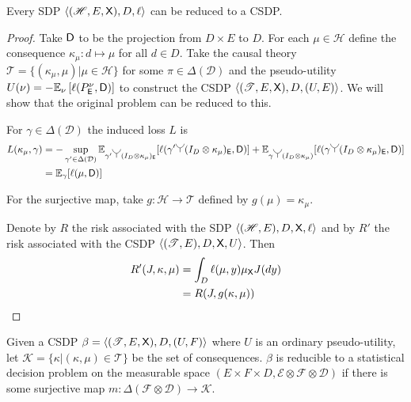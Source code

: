 \begin{theorem}
Every SDP $\langle (\mathscr{H},E,\mathsf{X}),D,\ell\rangle$ can be reduced to a CSDP.
\end{theorem}
\begin{proof}
Take $\mathsf{D}$ to be the projection from $D\times E$ to $D$. For each $\mu\in \mathscr{H}$ define the consequence $\kappa_\mu:d\mapsto \mu$ for all $d\in D$. Take the causal theory $\mathscr{T}=\{(\kappa_\mu,\mu)|\mu\in \mathscr{H}\}$ for some $\pi\in \Delta(\mathcal{D})$ and the pseudo-utility $U(\nu) = -\mathbb{E}_\nu \left[\ell(P^\nu_{\mathsf{E}},\mathsf{D})\right]$ to construct the CSDP $\langle (\mathscr{T},E,\mathsf{X}),D,(U,E)\rangle$. We will show that the original problem can be reduced to this.

For $\gamma\in \Delta(\mathcal{D})$ the induced loss $L$ is
\begin{align}
    L(\kappa_\mu,\gamma) &= -\sup_{\gamma'\in \Delta(\mathcal{D})} \mathbb{E}_{\gamma' \splitter{0.15}(I_D\otimes \kappa_\mu)_{\RV{E}}}[\ell(\gamma'\splitter{0.15}(I_D\otimes \kappa_\mu)_{\RV{E}},\RV{D})] + \mathbb{E}_{\gamma \splitter{0.15}(I_D\otimes \kappa_\mu)}[\ell(\gamma \splitter{0.15}(I_D\otimes \kappa_\mu)_{\RV{E}},\RV{D})]\\
                     &= \mathbb{E}_{\gamma}[\ell(\mu,\RV{D})]
\end{align}

For the surjective map, take $g:\mathscr{H}\to \mathscr{T}$ defined by $g(\mu)=\kappa_\mu$.

Denote by $R$ the risk associated with the SDP $\langle (\mathscr{H},E),D,\mathsf{X},\ell\rangle$ and by $R'$ the risk associated with the CSDP $\langle (\mathscr{T},E),D,\mathsf{X},U\rangle$. Then
\begin{align}
    R'(J,\kappa,\mu) &= \int_D \ell(\mu, y) \mu_{\mathsf{X}} J(dy)\\
                   &=R(J,g(\kappa,\mu))
\end{align}
\end{proof}

\begin{theorem}
Given a CSDP $\beta=\langle (\mathscr{T},E,\mathsf{X}),D,(U,F)\rangle$ where $U$ is an ordinary pseudo-utility, let $\mathscr{K}=\{\kappa|(\kappa,\mu)\in \mathscr{T}\}$ be the set of consequences. $\beta$ is reducible to a statistical decision problem on the measurable space $(E\times F\times D,\mathcal{E}\otimes \mathcal{F}\otimes \mathcal{D})$ if there is some surjective map $m:\Delta(\mathcal{F}\otimes\mathcal{D})\to \mathscr{K}$.
\end{theorem}

